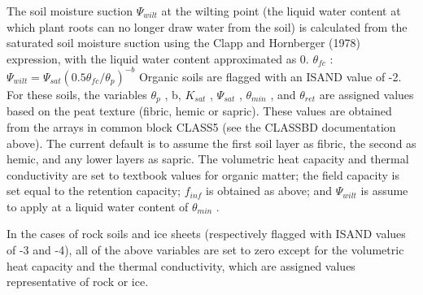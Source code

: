 The soil moisture suction $\Psi_{wilt}$ at the wilting point (the liquid water content at which plant roots can no longer draw water from the soil) is calculated from the saturated soil moisture suction using the Clapp and Hornberger (1978) expression, with the liquid water content approximated as 0. $\theta_{fc}$ \+: $\Psi_{wilt} = \Psi_{sat} (0.5 \theta_{fc} / \theta_p )^{-b}$ Organic soils are flagged with an I\+S\+A\+N\+D value of -\/2. For these soils, the variables $\theta_p$ , b, $K_{sat}$ , $\Psi_{sat}$ , $\theta_{min}$ , and $\theta_{ret}$ are assigned values based on the peat texture (fibric, hemic or sapric). These values are obtained from the arrays in common block C\+L\+A\+S\+S5 (see the C\+L\+A\+S\+S\+B\+D documentation above). The current default is to assume the first soil layer as fibric, the second as hemic, and any lower layers as sapric. The volumetric heat capacity and thermal conductivity are set to textbook values for organic matter; the field capacity is set equal to the retention capacity; $f_{inf}$ is obtained as above; and $\Psi_{wilt}$ is assume to apply at a liquid water content of $\theta_{min}$ .

In the cases of rock soils and ice sheets (respectively flagged with I\+S\+A\+N\+D values of -\/3 and -\/4), all of the above variables are set to zero except for the volumetric heat capacity and the thermal conductivity, which are assigned values representative of rock or ice.